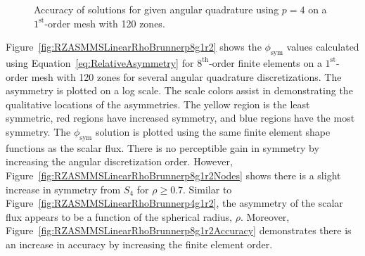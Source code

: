 \documentclass[12pt]{article}
\begin{document}
\begin{figure}[!htb]
\centering
{}
\caption{Accuracy of solutions for given angular quadrature using $p=4$ on a $1^\text{st}$-order mesh with 120 zones.}
\label{fig:RZASMMSLinearRhoBrunnerp4g1r2Accuracy}
\end{figure}

\FloatBarrier

Figure~\ref{fig:RZASMMSLinearRhoBrunnerp8g1r2} shows the $\phi_\text{sym}$ values calculated using Equation~\ref{eq:RelativeAsymmetry} for $8^\text{th}$-order finite elements on a $1^\text{st}$-order mesh with 120 zones for several angular quadrature discretizations. The asymmetry is plotted on a log scale. The scale colors assist in demonstrating the qualitative locations of the asymmetries. The yellow region is the least symmetric, red regions have increased symmetry, and blue regions have the most symmetry. The $\phi_\text{sym}$ solution is plotted using the same finite element shape functions as the scalar flux. There is no perceptible gain in symmetry by increasing the angular discretization order. However, Figure~\ref{fig:RZASMMSLinearRhoBrunnerp8g1r2Nodes} shows there is a slight increase in symmetry from $S_4$ for $\rho \geq 0.7$. Similar to Figure~\ref{fig:RZASMMSLinearRhoBrunnerp4g1r2}, the asymmetry of the scalar flux appears to be a function of the spherical radius, $\rho$. Moreover, Figure~\ref{fig:RZASMMSLinearRhoBrunnerp8g1r2Accuracy} demonstrates there is an increase in accuracy by increasing the finite element order.
\end{document}
